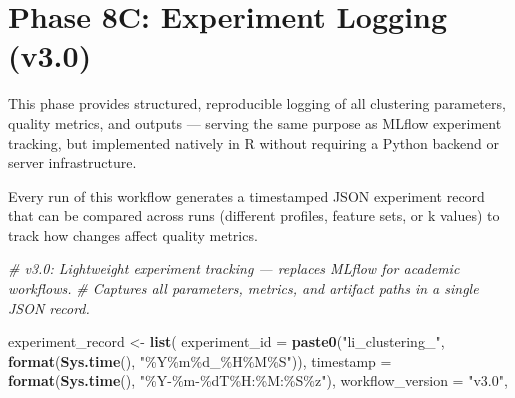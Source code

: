 \documentclass[
]{article}
\newenvironment{Shaded}{\begin{snugshade}}{\end{snugshade}}
\newcommand{\AttributeTok}[1]{\textcolor[rgb]{0.13,0.29,0.53}{#1}}
\newcommand{\CommentTok}[1]{\textcolor[rgb]{0.56,0.35,0.01}{\textit{#1}}}
\newcommand{\FunctionTok}[1]{\textcolor[rgb]{0.13,0.29,0.53}{\textbf{#1}}}
\newcommand{\NormalTok}[1]{#1}
\newcommand{\OtherTok}[1]{\textcolor[rgb]{0.56,0.35,0.01}{#1}}
\newcommand{\StringTok}[1]{\textcolor[rgb]{0.31,0.60,0.02}{#1}}
\begin{document}
\section{Phase 8C: Experiment Logging
(v3.0)}\label{phase-8c-experiment-logging-v3.0}

This phase provides structured, reproducible logging of all clustering
parameters, quality metrics, and outputs --- serving the same purpose as
MLflow experiment tracking, but implemented natively in R without
requiring a Python backend or server infrastructure.

Every run of this workflow generates a timestamped JSON experiment
record that can be compared across runs (different profiles, feature
sets, or k values) to track how changes affect quality metrics.

\begin{Shaded}
\begin{Highlighting}[]
\CommentTok{\# v3.0: Lightweight experiment tracking — replaces MLflow for academic workflows.}
\CommentTok{\# Captures all parameters, metrics, and artifact paths in a single JSON record.}

\NormalTok{experiment\_record }\OtherTok{\textless{}{-}} \FunctionTok{list}\NormalTok{(}
  \AttributeTok{experiment\_id   =} \FunctionTok{paste0}\NormalTok{(}\StringTok{"li\_clustering\_"}\NormalTok{, }\FunctionTok{format}\NormalTok{(}\FunctionTok{Sys.time}\NormalTok{(), }\StringTok{"\%Y\%m\%d\_\%H\%M\%S"}\NormalTok{)),}
  \AttributeTok{timestamp       =} \FunctionTok{format}\NormalTok{(}\FunctionTok{Sys.time}\NormalTok{(), }\StringTok{"\%Y{-}\%m{-}\%dT\%H:\%M:\%S\%z"}\NormalTok{),}
  \AttributeTok{workflow\_version =} \StringTok{"v3.0"}\NormalTok{,}


\end{Highlighting}
\end{Shaded}
\end{document}
